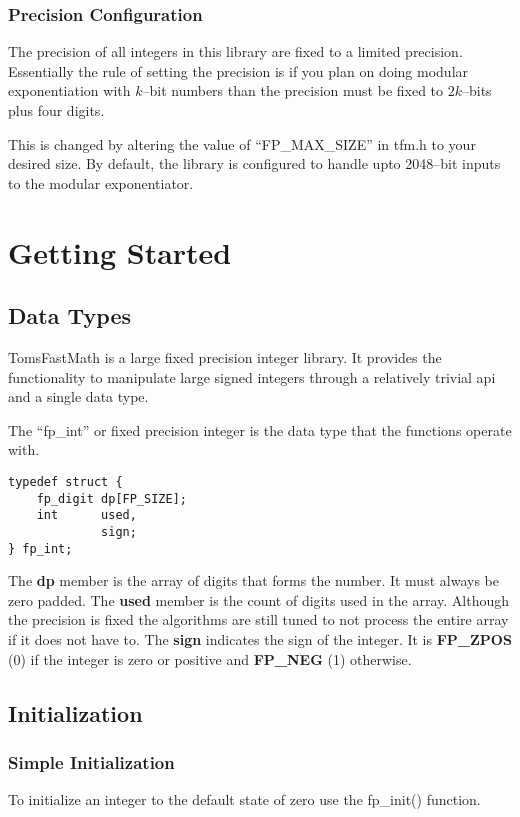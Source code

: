 \documentclass[b5paper]{book}
\begin{document}
\subsection{Precision Configuration}
The precision of all integers in this library are fixed to a limited precision.  Essentially
the rule of setting the precision is if you plan on doing modular exponentiation with $k$--bit
numbers than the precision must be fixed to $2k$--bits plus four digits.  

This is changed by altering the value of ``FP\_MAX\_SIZE'' in tfm.h to your desired size.  By default, 
the library is configured to handle upto 2048--bit inputs to the modular exponentiator.  

\chapter{Getting Started}
\section{Data Types}
TomsFastMath is a large fixed precision integer library.  It provides the functionality to 
manipulate large signed integers through a relatively trivial api and a single data type.

The ``fp\_int'' or fixed precision integer is the data type that the functions operate with.  

\begin{verbatim}
typedef struct {
    fp_digit dp[FP_SIZE];
    int      used, 
             sign;
} fp_int;
\end{verbatim}

The \textbf{dp} member is the array of digits that forms the number.  It must always be zero 
padded.  The \textbf{used} member is the count of digits used in the array.  Although the 
precision is fixed the algorithms are still tuned to not process the entire array if it 
does not have to.  The \textbf{sign} indicates the sign of the integer.  It is \textbf{FP\_ZPOS} (0)
if the integer is zero or positive and \textbf{FP\_NEG} (1) otherwise.

\section{Initialization}
\subsection{Simple Initialization}
To initialize an integer to the default state of zero use the fp\_init() function.
\end{document}
